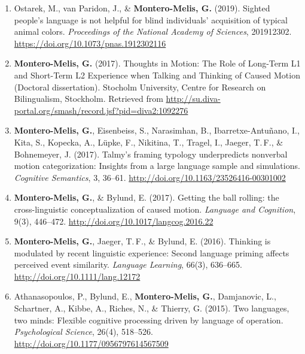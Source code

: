 \documentclass[margin, 11pt]{res} %
\begin{document}
\begin{resume}
\begin{enumerate}
	\item Ostarek, M., van Paridon, J., \& \textbf{Montero-Melis, G.} (2019). Sighted people’s language is not helpful for blind individuals’ acquisition of typical animal colors. \emph{Proceedings of the National Academy of Sciences}, 201912302. \url{https://doi.org/10.1073/pnas.1912302116}


	
	\item \textbf{Montero-Melis, G.} (2017). Thoughts in Motion: The Role of Long-Term L1 and Short-Term L2 Experience when Talking and Thinking of Caused Motion (Doctoral dissertation). Stocholm University, Centre for Research on Bilingualism, Stockholm. Retrieved from \url{http://su.diva-portal.org/smash/record.jsf?pid=diva2:1092276}

	\item \textbf{Montero-Melis, G.}, Eisenbeiss, S., Narasimhan, B., Ibarretxe-Antu\~{n}ano, I., Kita, S., Kopecka, A., L{\"u}pke, F., Nikitina, T., Tragel, I., Jaeger, T.\,F., \& Bohnemeyer, J. (2017). Talmy's framing typology underpredicts nonverbal motion categorization: Insights from a large language sample and simulations. \emph{Cognitive Semantics}, 3, 36--61. \url{http://doi.org/10.1163/23526416-00301002}

	\item \textbf{Montero-Melis, G.}, \& Bylund, E. (2017). Getting the ball rolling: the cross-linguistic conceptualization of caused motion. \emph{Language and Cognition}, 9(3), 446--472. \url{http://doi.org/10.1017/langcog.2016.22}

	\item \textbf{Montero-Melis, G.}, Jaeger, T.\,F., \& Bylund, E. (2016). Thinking is modulated by recent linguistic experience: Second language priming affects perceived event similarity. \emph{Language Learning}, 66(3), 636--665. \url{http://doi.org/10.1111/lang.12172}

	\item Athanasopoulos, P., Bylund, E., \textbf{Montero-Melis, G.}, Damjanovic, L., Schartner, A., Kibbe, A., Riches, N., \& Thierry, G. (2015). Two languages, two minds: Flexible cognitive processing driven by language of operation. \emph{Psychological Science}, 26(4), 518--526. \url{http://doi.org/10.1177/0956797614567509}


\end{enumerate}
\end{resume}
\end{document}
